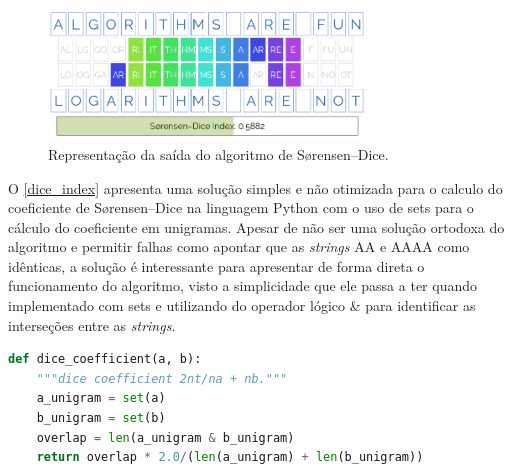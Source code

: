 \begin{figure}[h]
  \centering
  \includegraphics[width=0.75\textwidth]{figuras/dice}
  \caption{Representação da saída do algoritmo de Sørensen–Dice\protect\footnotemark.}
  \label{fig:dice_example}
\end{figure}

O \autoref{dice_index} apresenta uma solução simples e não otimizada para o calculo do coeficiente de Sørensen–Dice na linguagem Python com o uso de {\code sets} para o cálculo do coeficiente em unigramas. Apesar de não ser uma solução ortodoxa do algoritmo e permitir falhas como apontar que as \textit{strings} {\code AA} e {\code AAAA} como idênticas, a solução é interessante para apresentar de forma direta o funcionamento do algoritmo, visto a simplicidade que ele passa a ter quando implementado com {\code sets} e utilizando do operador lógico \& para identificar as interseções entre as \textit{strings}.

\begin{lstlisting}[language=Python,label=dice_index,caption={Simples implementação do coeficiente de Sørensen–Dice}]
def dice_coefficient(a, b):
    """dice coefficient 2nt/na + nb."""
    a_unigram = set(a)
    b_unigram = set(b)
    overlap = len(a_unigram & b_unigram)
    return overlap * 2.0/(len(a_unigram) + len(b_unigram))
\end{lstlisting}





